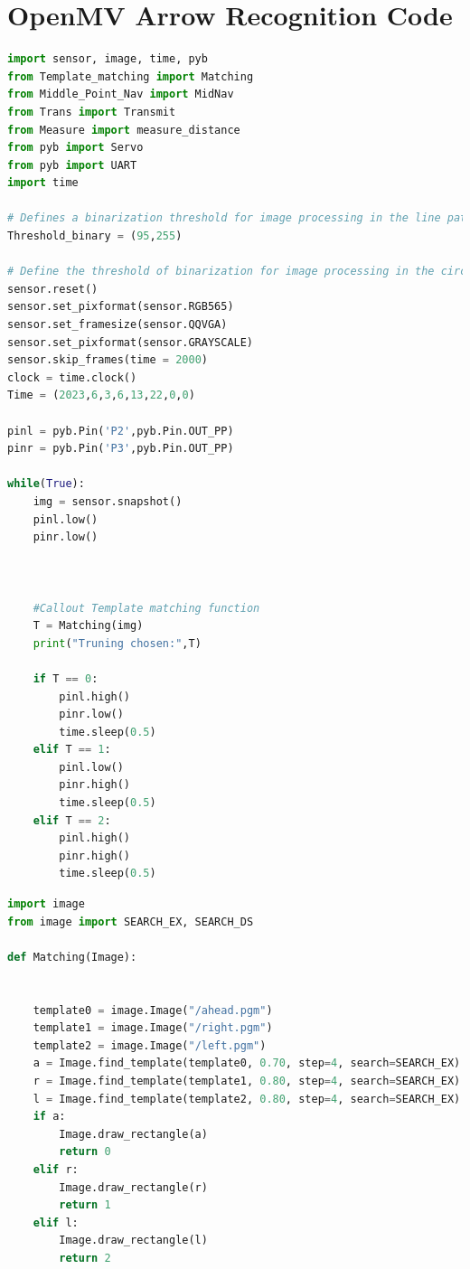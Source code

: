 \documentclass[12pt, a4paper, oneside]{report}
\begin{document}
\section*{OpenMV Arrow Recognition Code}
\begin{lstlisting}[language=Python]
import sensor, image, time, pyb
from Template_matching import Matching
from Middle_Point_Nav import MidNav
from Trans import Transmit
from Measure import measure_distance
from pyb import Servo
from pyb import UART
import time

# Defines a binarization threshold for image processing in the line patrol module
Threshold_binary = (95,255)

# Define the threshold of binarization for image processing in the circuit module. The program requires several interrupts, namely instructions at the beginning and instructions at entering the template recognition state, which should be sent by STM32 to OpenMV
sensor.reset()
sensor.set_pixformat(sensor.RGB565)
sensor.set_framesize(sensor.QQVGA)
sensor.set_pixformat(sensor.GRAYSCALE)
sensor.skip_frames(time = 2000)
clock = time.clock()
Time = (2023,6,3,6,13,22,0,0)

pinl = pyb.Pin('P2',pyb.Pin.OUT_PP)
pinr = pyb.Pin('P3',pyb.Pin.OUT_PP)

while(True):
    img = sensor.snapshot()
    pinl.low()
    pinr.low()



    #Callout Template matching function
    T = Matching(img)
    print("Truning chosen:",T)

    if T == 0:
        pinl.high()
        pinr.low()
        time.sleep(0.5)
    elif T == 1:
        pinl.low()
        pinr.high()
        time.sleep(0.5)
    elif T == 2:
        pinl.high()
        pinr.high()
        time.sleep(0.5)
\end{lstlisting}
\begin{lstlisting}[language=Python]
import image
from image import SEARCH_EX, SEARCH_DS

def Matching(Image):


    template0 = image.Image("/ahead.pgm")
    template1 = image.Image("/right.pgm")
    template2 = image.Image("/left.pgm")
    a = Image.find_template(template0, 0.70, step=4, search=SEARCH_EX)
    r = Image.find_template(template1, 0.80, step=4, search=SEARCH_EX)
    l = Image.find_template(template2, 0.80, step=4, search=SEARCH_EX)
    if a:
        Image.draw_rectangle(a)
        return 0
    elif r:
        Image.draw_rectangle(r)
        return 1
    elif l:
        Image.draw_rectangle(l)
        return 2
\end{lstlisting}
\end{document}
